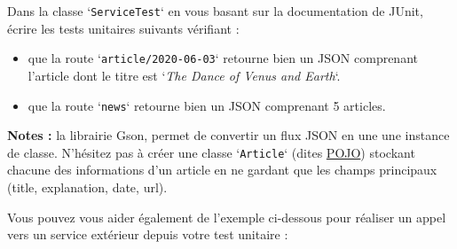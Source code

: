 \documentclass[11pt,a4paper,oneside]{article}
\begin{document}
%

\vspace{5mm}
Dans la classe `\texttt{ServiceTest}` en vous basant sur la documentation de JUnit, écrire les tests unitaires suivants vérifiant :

\begin{itemize}
	\item que la route `\texttt{article/2020-06-03}` retourne bien un JSON comprenant l'article dont le titre est `\textit{The Dance of Venus and Earth}`.
	\item que la route `\texttt{news}` retourne bien un JSON comprenant 5 articles.
\end{itemize}

\vspace{5mm}
\textbf{Notes :} la librairie Gson, permet de convertir un flux JSON en une une instance de classe. N'hésitez pas à créer une classe `\texttt{Article}` (dites \href{https://fr.wikipedia.org/wiki/Plain_old_Java_object}{POJO}) stockant chacune des informations d'un article en ne gardant que les champs principaux (title, explanation, date, url).

\vspace{5mm}
Vous pouvez vous aider également de l'exemple ci-dessous pour réaliser un appel vers un service extérieur depuis votre test unitaire :
\end{document}
